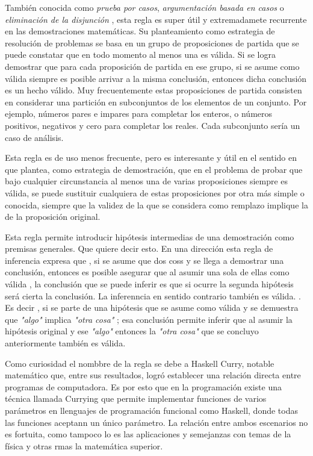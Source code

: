 

También conocida como \textit{prueba por casos}, \textit{argumentación basada en casos} o \textit{eliminación de la disjunción} , esta regla es super útil y extremadamete recurrente en las demostraciones matemáticas. Su planteamiento como estrategia de resolución de problemas se basa en un grupo de proposiciones de partida que se puede constatar que en todo momento al menos una es válida. Si se logra demostrar que para cada proposición de partida en ese grupo, si se asume como válida siempre es posible arrivar a la misma conclusión, entonces dicha conclusión es un hecho válido. Muy frecuentemente estas proposiciones de partida consisten en considerar una partición en subconjuntos de los elementos de un conjunto. Por ejemplo, números pares e impares para completar los enteros, o números positivos, negativos y cero para completar los reales. Cada subconjunto sería un caso de análisis.



Esta regla es de uso menos frecuente, pero es interesante y útil en el sentido en que plantea, como estrategia de demostración, que en el problema de probar que bajo cualquier circunstancia al menos una de varias proposiciones siempre es válida, se puede sustituir cualquiera de estas proposiciones por otra más simple o conocida, siempre que la validez de la que se considera como remplazo implique la de la proposición original.



Esta regla permite introducir hipótesis intermedias de una demostración como premisas generales. Que quiere decir esto. En una dirección esta regla de inferencia expresa que , si se asume que dos coss y se llega a demostrar una conclusión, entonces es posible asegurar que al asumir una sola de ellas como válida , la conclusión que se puede inferir es que si ocurre la segunda hipótesis será cierta la conclusión. La inferenncia en sentido contrario también es válida. . Es decir , si se parte de una hipótesis que se asume como válida y se demuestra que \textit{"algo"} implica \textit{"otra cosa"} ; esa conclusión permite inferir que al asumir la hipótesis original y ese \textit{"algo"} entonces la \textit{"otra cosa"} que se concluyo anteriormente también es válida.

Como curiosidad el nombbre de la regla se debe a Haskell Curry, notable matemático que, entre sus resultados, logró establecer una relación directa entre programas de computadora. Es por esto que en la programación existe una técnica llamada Currying que permite implementar funciones de varios parámetros en llenguajes de programación funcional como Haskell, donde todas las funciones aceptann un único parámetro. La relación entre ambos escenarios no es fortuita, como tampoco lo es las aplicaciones y semejanzas con temas de la física y otras rmas la matemática superior.

